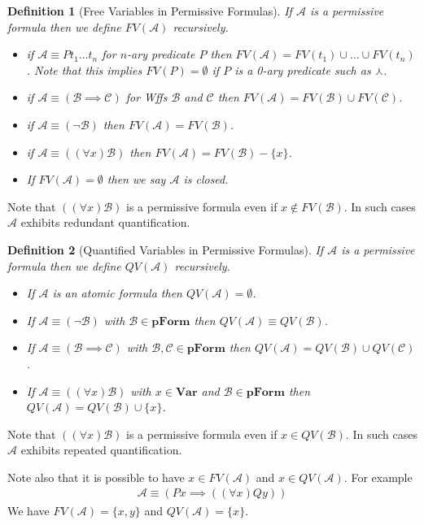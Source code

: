 \documentclass[12pt]{article}
\theoremstyle{break}
\newtheorem{definition}{Definition}[section]
\theoremstyle{break}
\theoremstyle{break}
\theoremstyle{break}
\newcommand{\mc}[1]{\mathcal{#1}}
\begin{document}
\begin{definition}[Free Variables in Permissive Formulas]
If $\mc{A}$ is a permissive formula then we define $FV(\mc{A})$ recursively.
\begin{itemize}
\item{if $\mc{A} \equiv Pt_1\ldots t_n$ for $n$-ary predicate $P$ then $FV(\mc{A}) = FV(t_1)\cup\ldots\cup FV(t_n)$. Note that this implies $FV(P)=\emptyset$ if $P$ is a 0-ary predicate such as $\curlywedge$.}
\item{if $\mc{A} \equiv (\mc{B}\implies \mc{C})$ for Wffs $\mc{B}$ and $\mc{C}$ then $FV(\mc{A}) = FV(\mc{B})\cup FV(\mc{C})$.}
\item{if $\mc{A} \equiv (\lnot\mc{B})$ then $FV(\mc{A}) = FV(\mc{B})$.}
\item{if $\mc{A} \equiv ((\forall x)\mc{B})$ then $FV(\mc{A}) = FV(\mc{B}) - \{x\}$.}
\item{If $FV(\mc{A}) = \emptyset$ then we say $\mc{A}$ is closed.}
\end{itemize}
\end{definition}

Note that $((\forall x) \mc{B})$ is a permissive formula even if $x\not \in FV(\mc{B})$.
In such cases $\mc{A}$ exhibits redundant quantification.

\begin{definition}[Quantified Variables in Permissive Formulas]
If $\mc{A}$ is a permissive formula then we define $QV(\mc{A})$ recursively.

\begin{itemize}
\item{If $\mc{A}$ is an atomic formula then $QV(\mc{A}) = \emptyset$.}
\item{If $\mc{A} \equiv (\lnot \mc{B})$ with $\mc{B}\in\textbf{pForm}$ then $QV(\mc{A}) \equiv QV(\mc{B})$.}
\item{If $\mc{A} \equiv (\mc{B} \implies \mc{C})$ with $\mc{B}, \mc{C}\in\textbf{pForm}$ then $QV(\mc{A}) = QV(\mc{B}) \cup QV(\mc{C})$.}
\item{If $\mc{A} \equiv ((\forall x) \mc{B})$ with $x\in\textbf{Var}$ and $\mc{B}\in\textbf{pForm}$ then $QV(\mc{A}) = QV(\mc{B}) \cup \{x\}$.}
\end{itemize}
\end{definition}

Note that $((\forall x)\mc{B})$ is a permissive formula even if $x\in QV(\mc{B})$.
In such cases $\mc{A}$ exhibits repeated quantification.

Note also that it is possible to have $x\in FV(\mc{A})$ and $x\in QV(\mc{A})$.
For example
\begin{align}
\mc{A} \equiv (Px \implies ((\forall x) Qy))
\end{align}
We have $FV(\mc{A}) = \{x, y\}$ and $QV(\mc{A}) = \{x\}$.
\end{document}
